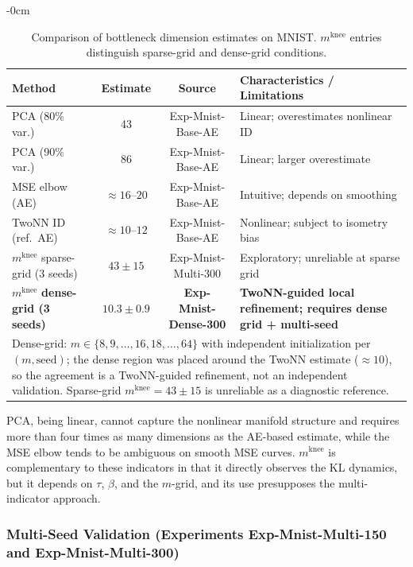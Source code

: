 \documentclass[make,article,submit,pdftex,moreauthors]{Definitions/mdpi}
\newcommand{\mknee}{m^{\mathrm{knee}}}
\begin{document}
\begin{table}[H]
\begin{adjustwidth}{-\extralength}{0cm}
\centering
\caption{Comparison of bottleneck dimension estimates on MNIST. $\mknee$ entries distinguish sparse-grid and dense-grid conditions.}
\label{tab:method_comparison}
\small
\begin{tabular}{p{4.0cm}cc p{4.5cm}}
\toprule
Method & Estimate & Source & Characteristics / Limitations \\
\midrule
PCA (80\% var.) & 43 & Exp-Mnist-Base-AE & Linear; overestimates nonlinear ID \\
PCA (90\% var.) & 86 & Exp-Mnist-Base-AE & Linear; larger overestimate \\
MSE elbow (AE) & $\approx16$--$20$ & Exp-Mnist-Base-AE & Intuitive; depends on smoothing \\
TwoNN ID (ref.\ AE) & $\approx10$--$12$ & Exp-Mnist-Base-AE & Nonlinear; subject to isometry bias \\
\midrule
$\mknee$ sparse-grid (3 seeds) & $43\pm15$ & Exp-Mnist-Multi-300 & Exploratory; unreliable at sparse grid \\
$\mknee$ \textbf{dense-grid (3 seeds)} & $\boldsymbol{10.3\pm0.9}$ & \textbf{Exp-Mnist-Dense-300} & \textbf{TwoNN-guided local refinement; requires dense grid + multi-seed} \\
\midrule
\multicolumn{4}{p{13.5cm}}{\footnotesize Dense-grid: $m\in\{8,9,\ldots,16,18,\ldots,64\}$ with independent initialization per $(m,\mathrm{seed})$; the dense region was placed around the TwoNN estimate ($\approx10$), so the agreement is a TwoNN-guided refinement, not an independent validation. Sparse-grid $\mknee=43\pm15$ is unreliable as a diagnostic reference.} \\
\bottomrule
\end{tabular}
\end{adjustwidth}
\end{table}

PCA, being linear, cannot capture the nonlinear manifold structure and requires more than
four times as many dimensions as the AE-based estimate, while the MSE elbow tends to be
ambiguous on smooth MSE curves.
$\mknee$ is complementary to these indicators in that it directly observes the KL dynamics,
but it depends on $\tau$, $\beta$, and the $m$-grid, and its use presupposes the
multi-indicator approach.

\subsubsection{Multi-Seed Validation (Experiments Exp-Mnist-Multi-150 and Exp-Mnist-Multi-300)}\label{sec:exp_multiseed}
\label{sec:exp_multiseed2}
\end{document}
